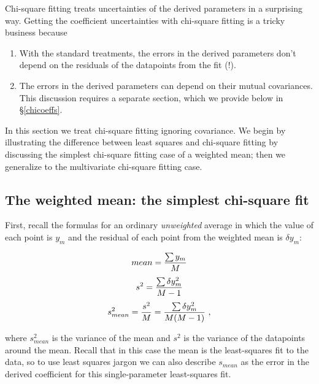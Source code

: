 \documentclass[psfig,preprint]{aastex}
\begin{document}
	Chi-square fitting treats uncertainties of the derived
parameters in a surprising way. Getting the 
coefficient uncertainties with chi-square fitting is a tricky business 
because \begin{enumerate}

\item With the standard treatments, the errors in the derived parameters
don't depend on the residuals of the datapoints from the fit (!).

\item The errors in the derived parameters can depend on their mutual
covariances. This discussion requires a separate section, which we
provide below in \S \ref{chicoeffs}. 

\end{enumerate}

\noindent In this section we treat chi-square fitting ignoring
covariance. We begin by illustrating the difference between least
squares and chi-square fitting by discussing the simplest chi-square
fitting case of a weighted mean; then we generalize to the multivariate
chi-square fitting case. 

\subsection{ The weighted mean: the simplest chi-square fit}

\label{chicoeffsnoco}

        First, recall the formulas for an ordinary {\it unweighted}  
average in which the value of each point is $y_m$ and the residual of
each point from the weighted mean is $\delta y_m$:

\begin{mathletters}
\begin{equation}
mean = {\sum y_m \over M}
\end{equation}
\begin{equation}
s^2 = {\sum \delta y_m^2 \over M-1}
\end{equation}
\begin{equation} \label{meanvariance}
s_{mean}^2  = {s^2 \over M} = {\sum \delta y_m^2 \over M(M-1)} \ ,
\end{equation}
\end{mathletters}

\noindent where $s_{mean}^2$ is the variance of the mean and $s^2$
is the variance of the datapoints around the mean.  Recall that in this
case the mean is the least-squares fit to the data, so to use least squares
jargon we can also describe $s_{mean}$ as the error in the derived
coefficient for this single-parameter least-squares fit.
\end{document}

